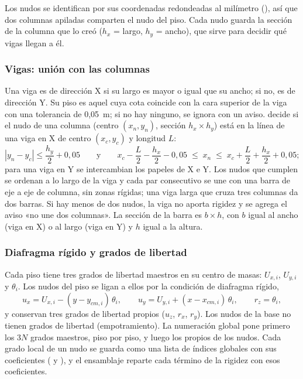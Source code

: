 Los nudos se identifican por sus coordenadas redondeadas al milímetro (), así que dos
columnas apiladas comparten el nudo del piso. Cada nudo guarda la sección de la columna que lo creó ($h_x$ = largo,
$h_y$ = ancho), que sirve para decidir qué vigas llegan a él.

\subsubsection{Vigas: unión con las columnas}
\label{sec:sis-vigas}

Una viga es de dirección X si su largo es mayor o igual que su ancho; si no, es de dirección Y. Su piso es aquel cuya
cota coincide con la cara superior de la viga con una tolerancia de 0,05~m; si no hay ninguno, se ignora con un aviso.
 decide si el nudo de una columna (centro $(x_n, y_n)$, sección $h_x \times h_y$) está en la
línea de una viga en X de centro $(x_c, y_c)$ y longitud $L$:
\begin{equation}
	|y_n - y_c| \le \frac{h_y}{2} + 0{,}05
	\qquad \text{y} \qquad
	x_c - \frac{L}{2} - \frac{h_x}{2} - 0{,}05 \;\le\; x_n \;\le\; x_c + \frac{L}{2} + \frac{h_x}{2} + 0{,}05 ;
	\label{eq:sis-enlinea}
\end{equation}
para una viga en Y se intercambian los papeles de X e Y. Los nudos que cumplen se ordenan a lo largo de la viga y cada
par consecutivo se une con una barra de eje a eje de columna, sin zonas rígidas; una viga larga que cruza tres columnas
da dos barras. Si hay menos de dos nudos, la viga no aporta rigidez y se agrega el aviso «no une dos columnas». La
sección de la barra es $b \times h$, con $b$ igual al ancho (viga en X) o al largo (viga en Y) y $h$ igual a la altura.

\subsubsection{Diafragma rígido y grados de libertad}

Cada piso tiene tres grados de libertad maestros en su centro de masas: $U_{x,i}$, $U_{y,i}$ y $\theta_i$. Los nudos del
piso se ligan a ellos por la condición de diafragma rígido,
\begin{equation}
	u_x = U_{x,i} - (y - y_{cm,i})\,\theta_i, \qquad u_y = U_{y,i} + (x - x_{cm,i})\,\theta_i, \qquad r_z = \theta_i ,
	\label{eq:sis-diafragma}
\end{equation}
y conservan tres grados de libertad propios ($u_z$, $r_x$, $r_y$). Los nudos de la base no tienen grados de libertad
(empotramiento). La numeración global pone primero los $3N$ grados maestros, piso por piso, y luego los propios de los
nudos. Cada grado local de un nudo se guarda como una lista de índices globales con sus coeficientes
( y ), y el ensamblaje reparte cada término de la rigidez con esos
coeficientes.

